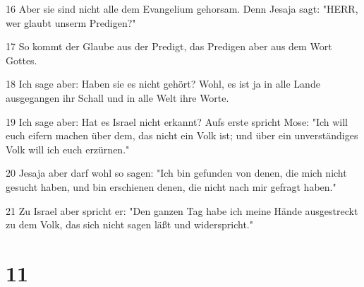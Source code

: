\par 16 Aber sie sind nicht alle dem Evangelium gehorsam. Denn Jesaja sagt: "HERR, wer glaubt unserm Predigen?"
\par 17 So kommt der Glaube aus der Predigt, das Predigen aber aus dem Wort Gottes.
\par 18 Ich sage aber: Haben sie es nicht gehört? Wohl, es ist ja in alle Lande ausgegangen ihr Schall und in alle Welt ihre Worte.
\par 19 Ich sage aber: Hat es Israel nicht erkannt? Aufs erste spricht Mose: "Ich will euch eifern machen über dem, das nicht ein Volk ist; und über ein unverständiges Volk will ich euch erzürnen."
\par 20 Jesaja aber darf wohl so sagen: "Ich bin gefunden von denen, die mich nicht gesucht haben, und bin erschienen denen, die nicht nach mir gefragt haben."
\par 21 Zu Israel aber spricht er: "Den ganzen Tag habe ich meine Hände ausgestreckt zu dem Volk, das sich nicht sagen läßt und widerspricht."

\chapter{11}

